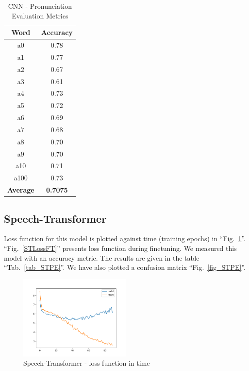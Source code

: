 \documentclass[conference]{IEEEtran}
\begin{document}
\begin{table}[hbtp]
    \caption{CNN - Pronunciation Evaluation Metrics}
    \begin{center}
    \begin{tabular}{|c|c|}
    \hline
    \textbf{Word} & {\textbf{Accuracy}} \\
    \hline
    a0 & 0.78 \\
    \hline
    a1 & 0.77 \\
    \hline
    a2 & 0.67 \\
    \hline
    a3 & 0.61 \\
    \hline
    a4 & 0.73 \\
    \hline
    a5 & 0.72 \\
    \hline
    a6 & 0.69 \\
    \hline
    a7 & 0.68 \\
    \hline
    a8 & 0.70 \\
    \hline
    a9 & 0.70 \\
    \hline
    a10 & 0.71 \\
    \hline
    a100 & 0.73 \\
    \hline
    \textbf{Average} & \textbf{0.7075} \\
    \hline
    \end{tabular}
    \label{tab_CNNPE_acc}
    \end{center}
    \end{table}

\subsection{Speech-Transformer}

Loss function for this model is plotted against time (training epochs) in ``Fig.~\ref{STLoss}''.
``Fig.~\ref{STLossFT}'' presents loss function during finetuning.
We measured this model with an accuracy metric. The results are given in the table ``Tab.~\ref{tab_STPE}''. We have also plotted a confusion matrix ``Fig.~\ref{fig_STPE}''.

\begin{figure}[hbtp]
    \centerline{\includegraphics[width=0.5\textwidth]{Figures/Fig_ST_loss.png}}
    \caption{Speech-Transformer - loss function in time}
    \label{STLoss} %
    \end{figure}
\end{document}
